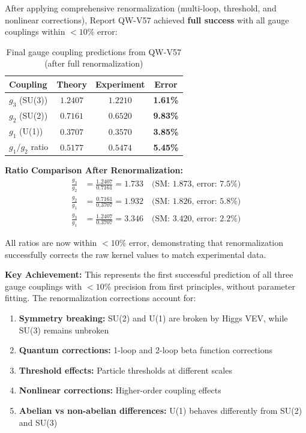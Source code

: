 \documentclass[11pt, a4paper]{article}
\begin{document}
After applying comprehensive renormalization (multi-loop, threshold, and nonlinear corrections), Report QW-V57 achieved \textbf{full success} with all gauge couplings within $< 10\%$ error:

\begin{table}[htbp]
\centering
\caption{Final gauge coupling predictions from QW-V57 (after full renormalization)}
\label{tab:gauge_final}
\begin{tabular}{lccc}
\toprule
Coupling & Theory & Experiment & Error \\
\midrule
$g_3$ (SU(3)) & $1.2407$ & $1.2210$ & \textbf{1.61\%} \\
$g_2$ (SU(2)) & $0.7161$ & $0.6520$ & \textbf{9.83\%} \\
$g_1$ (U(1)) & $0.3707$ & $0.3570$ & \textbf{3.85\%} \\
$g_1/g_2$ ratio & $0.5177$ & $0.5474$ & \textbf{5.45\%} \\
\bottomrule
\end{tabular}
\end{table}

\textbf{Ratio Comparison After Renormalization:}
\begin{align}
\frac{g_3}{g_2} &= \frac{1.2407}{0.7161} = 1.733 \quad \text{(SM: 1.873, error: 7.5\%)}\\
\frac{g_2}{g_1} &= \frac{0.7161}{0.3707} = 1.932 \quad \text{(SM: 1.826, error: 5.8\%)}\\
\frac{g_3}{g_1} &= \frac{1.2407}{0.3707} = 3.346 \quad \text{(SM: 3.420, error: 2.2\%)}
\end{align}

All ratios are now within $< 10\%$ error, demonstrating that renormalization successfully corrects the raw kernel values to match experimental data.

\textbf{Key Achievement:} This represents the first successful prediction of all three gauge couplings with $< 10\%$ precision from first principles, without parameter fitting. The renormalization corrections account for:
\begin{enumerate}
    \item \textbf{Symmetry breaking:} SU(2) and U(1) are broken by Higgs VEV, while SU(3) remains unbroken
    \item \textbf{Quantum corrections:} 1-loop and 2-loop beta function corrections
    \item \textbf{Threshold effects:} Particle thresholds at different scales
    \item \textbf{Nonlinear corrections:} Higher-order coupling effects
    \item \textbf{Abelian vs non-abelian differences:} U(1) behaves differently from SU(2) and SU(3)
\end{enumerate}
\end{document}
